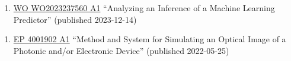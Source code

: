 
\newcommand{\patentref}[5]{\href{#4}{#1 #2} ``#3'' (granted #5)}
\newcommand{\patentpubref}[5]{\href{#4}{#1 #2} ``#3'' (published #5)}

{
    \ifdefined\shortcv
        {}
    \else
        {
            \begin{enumerate}
                \item [] \patentpubref{WO}
                                        {WO2023237560 A1}
                                        {Analyzing an Inference of a Machine Learning Predictor}
                                        {https://patentimages.storage.googleapis.com/3d/6c/b6/935e952fe109fa/WO2023237560A1.pdf}
                                        {2023-12-14}
            \end{enumerate}
        }
    \fi
}

{
    \ifdefined\shortcv
        {}
    \else
        {
            \begin{enumerate}
                \item [] \patentpubref{EP}
                                        {4001902 A1}
                                        {Method and System for Simulating an Optical Image of a Photonic and/or Electronic Device}
                                        {https://patentimages.storage.googleapis.com/36/85/0c/89e60111328058/EP4001902A1.pdf}
                                        {2022-05-25}
            \end{enumerate}
        }
    \fi
}


